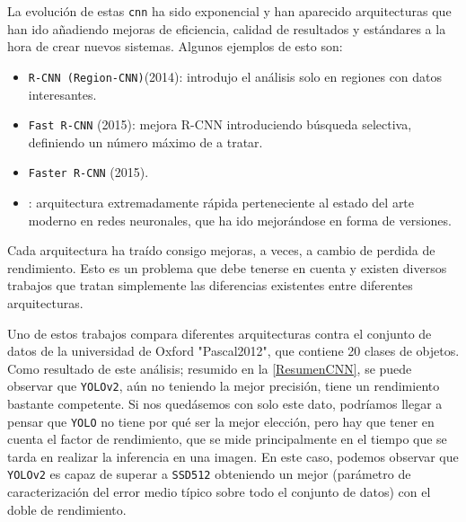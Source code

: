 \clearpage

La evolución de estas \texttt{\acrshort{cnn}} ha sido exponencial y han aparecido arquitecturas que han ido añadiendo mejoras de eficiencia, calidad de resultados y estándares a la hora de crear nuevos 
sistemas. Algunos ejemplos de esto son:
\begin{itemize}
    \item \texttt{R-CNN (Region-CNN)}(2014): introdujo el análisis solo en regiones con datos interesantes.
    \item \texttt{Fast R-CNN} (2015): mejora R-CNN introduciendo búsqueda selectiva, definiendo un número máximo de \texttt{} a tratar.
    \item \texttt{Faster R-CNN} (2015).
    \item \texttt{}\cite{redmonYouOnlyLook2016}: arquitectura extremadamente rápida perteneciente al estado del arte moderno en redes neuronales, que ha ido mejorándose en forma de versiones.
\end{itemize}

Cada arquitectura ha traído consigo mejoras, a veces, a cambio de perdida de rendimiento. Esto es un problema que debe tenerse en cuenta y existen diversos trabajos que tratan simplemente las diferencias 
existentes entre diferentes arquitecturas.

Uno de estos trabajos\cite{hanAdvancedDeepLearningTechniques2018} compara diferentes arquitecturas contra el conjunto de datos de la universidad de Oxford "Pascal2012"\cite{PASCALVisualObject}, que contiene 20 clases de objetos.\newline
Como resultado de este análisis; resumido en la \autoref{ResumenCNN}, se puede observar que \texttt{YOLOv2}, aún no teniendo la mejor precisión, tiene un rendimiento bastante competente. Si nos quedásemos con solo este dato, podríamos llegar a pensar que \texttt{YOLO} 
no tiene por qué ser la mejor elección, pero hay que tener en cuenta el factor de rendimiento, que se mide principalmente en el tiempo que se tarda en realizar la inferencia en una imagen. En este caso, podemos observar 
que \texttt{YOLOv2} es capaz de superar a \texttt{SSD512} obteniendo un mejor \texttt{}(parámetro de caracterización del error medio típico sobre todo el conjunto de datos) con el doble de rendimiento.

